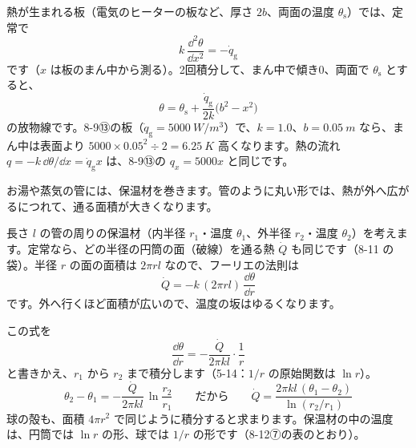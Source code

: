 熱が生まれる板（電気のヒーターの板など、厚さ $2b$、両面の温度 $\theta_{\mathrm s}$）では、定常で
\[k\,\frac{\dd^2\theta}{\dd x^2}=-\dot q_{\mathrm g}\]
です（$x$ は板のまん中から測る）。2回積分して、まん中で傾き0、両面で $\theta_{\mathrm s}$ とすると、
\[\theta=\theta_{\mathrm s}+\frac{\dot q_{\mathrm g}}{2k}\bigl(b^2-x^2\bigr)\]
の放物線です。8-9⑬の板（$\dot q_{\mathrm g}=\qty{5000}{W/m^3}$）で、$k=1.0$、$b=\qty{0.05}{m}$ なら、まん中は表面より $5000\times0.05^2\div2=\qty{6.25}{K}$ 高くなります。熱の流れ $q=-k\,\dd\theta/\dd x=\dot q_{\mathrm g}x$ は、8-9⑬の $q_x=5000x$ と同じです。

\label{ph:熱-11:sec7}
お湯や蒸気の管には、保温材を巻きます。管のように丸い形では、熱が外へ広がるにつれて、通る面積が大きくなります。

\noindent\begin{minipage}[c]{0.42\linewidth}\centering
{}
\end{minipage}\hfill
\begin{minipage}[c]{0.55\linewidth}\raggedright
長さ $l$ の管の周りの保温材（内半径 $r_1$・温度 $\theta_1$、外半径 $r_2$・温度 $\theta_2$）を考えます。定常なら、どの半径の円筒の面（破線）を通る熱 $\dot Q$ も同じです（8-11 の袋）。半径 $r$ の面の面積は $2\pi rl$ なので、フーリエの法則は
\[\dot Q=-k\,(2\pi rl)\,\frac{\dd\theta}{\dd r}\]
です。外へ行くほど面積が広いので、温度の坂はゆるくなります。
\end{minipage}

\par\vspace{4pt}
この式を
\[\frac{\dd\theta}{\dd r}=-\frac{\dot Q}{2\pi kl}\cdot\frac{1}{r}\]
と書きかえ、$r_1$ から $r_2$ まで積分します（5-14：$1/r$ の原始関数は $\ln r$）。
\[\theta_2-\theta_1=-\frac{\dot Q}{2\pi kl}\,\ln\frac{r_2}{r_1}\qquad\text{だから}\qquad\dot Q=\frac{2\pi kl\,(\theta_1-\theta_2)}{\ln(r_2/r_1)}\]
球の殻も、面積 $4\pi r^2$ で同じように積分すると求まります。保温材の中の温度は、円筒では $\ln r$ の形、球では $1/r$ の形です（8-12⑦の表のとおり）。

